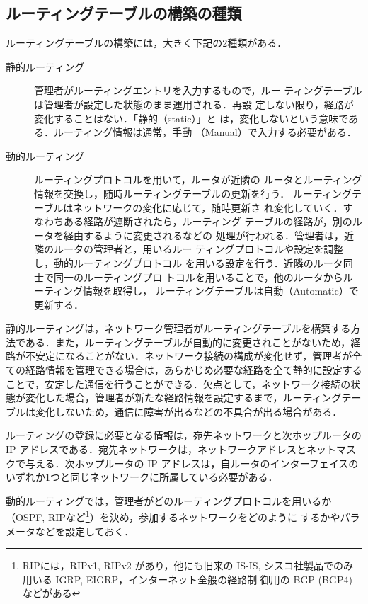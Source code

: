 \subsection{ルーティングテーブルの構築の種類}
ルーティングテーブルの構築には，大きく下記の2種類がある．
\begin{description}
\item[静的ルーティング] 管理者がルーティングエントリを入力するもので，ルー
	   ティングテーブルは管理者が設定した状態のまま運用される．再設
	   定しない限り，経路が変化することはない．「静的（static）」と
	   は，変化しないという意味である．ルーティング情報は通常，手動
	   （Manual）で入力する必要がある．
\item[動的ルーティング] ルーティングプロトコルを用いて，ルータが近隣の
  ルータとルーティング情報を交換し，随時ルーティングテーブルの更新を行う．
	   ルーティングテーブルはネットワークの変化に応じて，随時更新さ
	   れ変化していく．すなわちある経路が遮断されたら，ルーティング
	   テーブルの経路が，別のルータを経由するように変更されるなどの
	   処理が行われる．管理者は，近隣のルータの管理者と，用いるルー
	   ティングプロトコルや設定を調整し，動的ルーティングプロトコル
	   を用いる設定を行う．近隣のルータ同士で同一のルーティングプロ
	   トコルを用いることで，他のルータからルーティング情報を取得し，
	   ルーティングテーブルは自動（Automatic）で更新する．
\end{description}

静的ルーティングは，ネットワーク管理者がルーティングテーブルを構築する方
法である．また，ルーティングテーブルが自動的に変更されことがないため，経
路が不安定になることがない．ネットワーク接続の構成が変化せず，管理者が全
ての経路情報を管理できる場合は，あらかじめ必要な経路を全て静的に設定する
ことで，安定した通信を行うことができる．欠点として，ネットワーク接続の状
態が変化した場合，管理者が新たな経路情報を設定するまで，ルーティングテー
ブルは変化しないため，通信に障害が出るなどの不具合が出る場合がある．

ルーティングの登録に必要となる情報は，宛先ネットワークと次ホップルータの 
IP アドレスである．宛先ネットワークは，ネットワークアドレスとネットマス
クで与える．次ホップルータの IP アドレスは，自ルータのインターフェイスの
いずれか1つと同じネットワークに所属している必要がある．

動的ルーティングでは，管理者がどのルーティングプロトコルを用いるか
（OSPF, RIPなど\footnote{RIPには，RIPv1, RIPv2 があり，他にも旧来の
IS-IS, シスコ社製品でのみ用いる IGRP, EIGRP，インターネット全般の経路制
御用の BGP (BGP4) などがある}）を決め，参加するネットワークをどのように
するかやパラメータなどを設定しておく．

